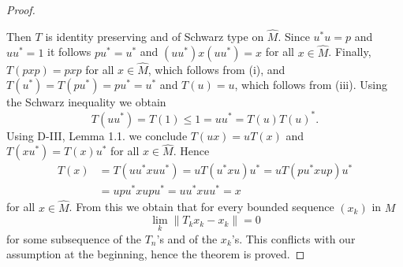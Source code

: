 \begin{proof}
\begin{enumerate}[(i)]
\end{enumerate}
Then $T$ is identity preserving and of Schwarz type on $\widehat{M}$.
Since $u^*u = p$ and $uu^* = 1$ it follows $pu^* = u^*$ and $(uu^*)x(uu^*) = x$ for all $x \in \widehat{M}$.
Finally, $T(pxp) = pxp$ for all $x \in \widehat{M}$, which follows from (i), and $T(u^*) = T(pu^*) = pu^* = u^*$ and $T(u) = u$, which follows from (iii).
Using the Schwarz inequality we obtain
\[
	T(uu^*) = T(1) \leq 1 = uu^* = T(u)T(u)^*.
\]
Using D-III, Lemma 1.1. we conclude $T(ux) = uT(x)$ and $T(xu^*) = T(x)u^*$ for all $x \in \widehat{M}$.
Hence
\begin{align*}
T(x) &= T(uu^*xuu^*) = uT(u^*xu)u^* = uT(pu^*xup)u^* \\
&= upu^*xupu^* = uu^*xuu^* = x
\end{align*}
for all $x \in \widehat{M}$.
From this we obtain that for every bounded sequence $(x_k)$ in $M$
\[
	\lim_k \|T_k x_k - x_k\| = 0
\]
for some subsequence of the $T_n$'s and of the $x_k$'s.
This conflicts with our assumption at the beginning, hence the theorem is proved.
\end{proof}


